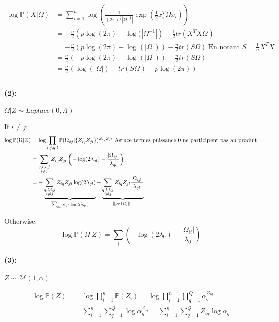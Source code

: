 \documentclass[10pt]{article}
\begin{document}
\begin{align*}
\log \mathbb{P}(X|\Omega) &= \sum_{i=1}^n \log \left( \frac{1}{(2\pi)^{\frac{p}{2}} |\Omega^{-1}|}  \exp(\frac{1}{2} x_i^{T} \Omega x_i) \right) \\
		& = -\frac{n}{2} \left( p\log(2\pi) + \log(|\Omega^{-1}| \right) - \frac{1}{2}tr(X^TX\Omega) \\ 
		& = -\frac{n}{2} \left( p\log(2\pi) - \log(|\Omega|) \right) - \frac{n}{2}tr(S\Omega)~ \text{En notant } S = \frac{1}{n}X^TX \\ 
		& = \frac{n}{2} \left( - p\log(2\pi) + \log(|\Omega|) \right) - \frac{n}{2}tr(S\Omega) \\ 
		& = \frac{n}{2} \left( \log(|\Omega|) - tr(S\Omega)  - p\log(2\pi) \right) \\
\end{align*}


\paragraph{(2):}  $\Omega|Z \sim Laplace(0, \Lambda)$

If $i\neq j$:
\begin{align*}
\log \mathbb{P}(\Omega|Z) &= \log \prod_{i,j,q,l} \mathbb{P}(\Omega_{ij}|\{Z_{iq}Z_{jl}\})^{Z_{iq}Z_{jl}}~ \text{Astuce termes puissance 0 ne participent pas au produit} \\ 
	& = \sum_{\substack{q,l,i,j \\ i \neq j}} Z_{iq}Z_{jl}\left( -\log (2\lambda_{ql}) - \frac{|\Omega_{ij}|}{\lambda_{ql}} \right) \\
	& = - \underbrace{\sum_{\substack{q,l,i,j \\ i \neq j}} Z_{iq}Z_{jl}\log (2\lambda_{ql})}_{\sum_{q,l} n_{ql} \log(2\lambda_{ql})} - \underbrace{\sum_{\substack{q,l,i,j \\ i \neq j}} Z_{iq}Z_{jl}\frac{|\Omega_{ij}|}{\lambda_{ql}}}_{\left\lVert{\rho_Z(\Omega)}\right\rVert_1} \\
\end{align*}

Otherwise: 
\[ \log \mathbb{P}(\Omega|Z) = \sum_{i} \left( -\log (2\lambda_{0}) - \frac{|\Omega_{ii}|}{\lambda_{0}} \right) \]


\paragraph{(3):} $Z \sim \mathcal{M}(1,\underline{\alpha})$

\begin{align*}
\log \mathbb{P}(Z) &= \log \prod_{i = 1}^n \mathbb{P}(Z_i) = \log \prod_{i = 1}^n \prod_{q = 1}^Q \alpha_q^{Z_{iq}} \\
	&=  \sum_{i = 1}^n \sum_{q = 1}^Q \log \alpha_q^{Z_{iq}} =  \sum_{i = 1}^n \sum_{q = 1}^Q Z_{iq} \log \alpha_q \\
\end{align*}
\end{document}

